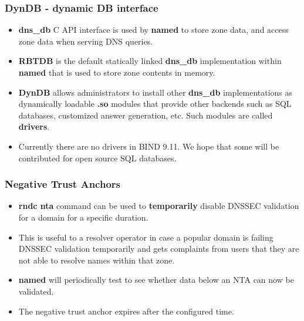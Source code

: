\documentclass[aspectratio=169,14pt]{beamer}
\begin{document}
\frame
{
  \frametitle{DynDB - dynamic DB interface}

  \begin{itemize}

  \item \textbf{dns\_db} C API interface is used by \textbf{named} to
    store zone data, and access zone data when serving DNS queries.

  \item \textbf{RBTDB} is the default statically linked \textbf{dns\_db}
    implementation within \textbf{named} that is used to store zone
    contents in memory.

  \item \textbf{DynDB} allows administrators to install other
    \textbf{dns\_db} implementations as dynamically loadable
    \textbf{.so} modules that provide other backends such as SQL
    databases, customized answer generation, etc. Such modules are
    called \textbf{drivers}.

  \item Currently there are no drivers in BIND 9.11. We hope that some
    will be contributed for open source SQL databases.

  \end{itemize}
}

\frame
{
  \frametitle{Negative Trust Anchors}

  \begin{itemize}

    \item \textbf{rndc nta} command can be used to \textbf{temporarily}
      disable DNSSEC validation for a domain for a specific duration.

    \item This is useful to a resolver operator in case a popular domain
      is failing DNSSEC validation temporarily and gets complaints from
      users that they are not able to resolve names within that zone.

    \item \textbf{named} will periodically test to see whether data
      below an NTA can now be validated.

    \item The negative trust anchor expires after the configured time.

  \end{itemize}
}
\end{document}
